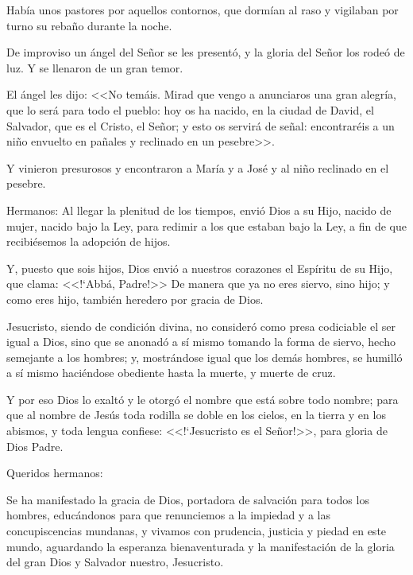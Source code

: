 Había unos pastores por aquellos contornos, 
que dormían al raso y vigilaban por turno su 
rebaño durante la noche. 

De improviso un 
ángel del Señor se les presentó, y la gloria del 
Señor los rodeó de luz. Y se llenaron de un 
gran temor. 

El ángel les dijo: <<No temáis. 
Mirad que vengo a anunciaros una gran 
alegría, que lo será para todo el pueblo: hoy os 
ha nacido, en la ciudad de David, el Salvador, 
que es el Cristo, el Señor; y esto os servirá de 
señal: encontraréis a un niño envuelto en 
pañales y reclinado en un pesebre>>. 

Y vinieron 
presurosos y encontraron a María y a José y al 
niño reclinado en el pesebre. 


 Hermanos: Al llegar la plenitud de los 
tiempos, envió Dios a su Hijo, nacido de 
mujer, nacido bajo la Ley, para redimir a los 
que estaban bajo la Ley, a fin de que 
recibiésemos la adopción de hijos. 

Y, puesto 
que sois hijos, Dios envió a nuestros corazones 
el Espíritu de su Hijo, que clama: <<!`Abbá, 
Padre!>>  De manera que ya no eres siervo, sino 
hijo; y como eres hijo, también heredero por 
gracia de Dios. 


Jesucristo, siendo de condición divina, no 
consideró como presa codiciable el ser igual a 
Dios, sino que se anonadó a sí mismo tomando 
la forma de siervo, hecho semejante a los 
hombres; y, mostrándose igual que los demás 
hombres, se humilló a sí mismo haciéndose 
obediente hasta la muerte, y muerte de cruz. 

Y por eso Dios lo exaltó y le otorgó el nombre 
que está sobre todo nombre; para que al 
nombre de Jesús toda rodilla se doble en los 
cielos, en la tierra y en los abismos, y toda 
lengua confiese: <<!`Jesucristo es el Señor!>>, para 
gloria de Dios Padre. 


 Queridos hermanos: 
 
 Se ha manifestado la 
gracia de Dios, portadora de salvación para 
todos los hombres, educándonos para que 
renunciemos a la impiedad y a las 
concupiscencias mundanas, y vivamos con 
prudencia, justicia y piedad en este mundo, 
aguardando la esperanza bienaventurada y la 
manifestación de la gloria del gran Dios y 
Salvador nuestro, Jesucristo. 

